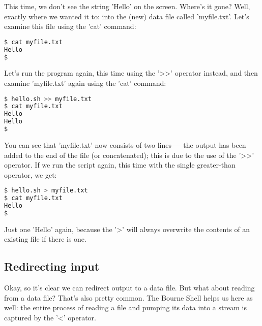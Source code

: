 This time, we don't see the string 'Hello' on the screen. Where's it gone?
Well, exactly where we wanted it to: into the (new) data file called
'myfile.txt'. Let's examine this file using the 'cat' command:
\lstset{basicstyle=\scriptsize, numbers=left, captionpos=b, tabsize=4}
\begin{lstlisting}[caption=Examining the results of redirecting some output,language={bash},
breaklines=true,xleftmargin=15pt,label=lst:Examining the results of redirecting some output]
$ cat myfile.txt
Hello
$
\end{lstlisting}

Let's run the program again, this time using the '\textgreater{}\textgreater{}'
operator instead, and then examine 'myfile.txt' again using the 'cat' command:
\lstset{basicstyle=\scriptsize, numbers=left, captionpos=b, tabsize=4}
\begin{lstlisting}[caption=Redirecting using the append redirect,language={bash},
breaklines=true,xleftmargin=15pt,label=lst:Redirecting using the append redirect]
$ hello.sh >> myfile.txt
$ cat myfile.txt
Hello
Hello
$
\end{lstlisting}

You can see that 'myfile.txt' now consists of two lines --- the output has been
added to the end of the file (or concatenated); this is due to the use of the
'\textgreater{}\textgreater{}' operator. If we run the script again, this time
with the single greater-than operator, we get:
\lstset{basicstyle=\scriptsize, numbers=left, captionpos=b, tabsize=4}
\begin{lstlisting}[caption=Redirecting using the overwrite redirect,language={bash},
breaklines=true,xleftmargin=15pt,label=lst:Redirecting using the overwrite redirect]
$ hello.sh > myfile.txt
$ cat myfile.txt
Hello
$
\end{lstlisting}

Just one 'Hello' again, because the '\textgreater{}' will always overwrite the
contents of an existing file if there is one.

\subsection{Redirecting input}
Okay, so it's clear we can redirect output to a data file. But what about
reading from a data file? That's also pretty common. The Bourne Shell helps us
here as well: the entire process of reading a file and pumping its data into a
stream is captured by the '\textless{}' operator.

